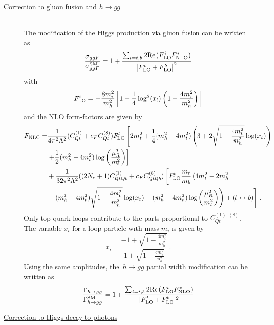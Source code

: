 	\begin{description}
		\item [\underline{Correction to gluon fusion and $h\to gg $ }] \hfill \vspace{0.3cm} \\
		The modification of the Higgs production via gluon fusion can be written as
		\begin{equation}
			\frac{\sigma_{ggF}}{\sigma_{ggF}^{\mathrm{SM}}}= 1+ \frac{ \sum_{i=t,b} 2 \mbox{Re}\,(F_{\textrm{LO}}^i F^*_{\textrm{NLO}})}{\left| F_{\textrm{LO}}^t+F_{\textrm{LO}}^b  \right|^2} \label{eq:production}
		\end{equation}
		with 
		\begin{equation}
			F_{\textrm{LO}}^i=-\frac{8m_i^2}{m_h^2}\left[1-\frac{1}{4}\log^2(x_i)\left(1-\frac{4m_i^2}{m_h^2}\right)\right]
		\end{equation}
		and the NLO form-factors are given by
		\begin{equation}
			\begin{split}
				F_{\textrm{NLO}}=&\frac{ 1}{4\pi^2  \Lambda^2}(C_{Qt}^{(1)}+c_FC_{Qt}^{(8)})F_{\textrm{LO}}^t \left[ 2 m_t^2  +\frac{1}{4} (m_h^2-4 m_t^2) \left( 3 +2 \sqrt{1-\frac{4 m_t^2}{m_h^2}} \log(x_t) \right)  \right. \\ & \left.
				+\frac{1}{2} (m_h^2-4 m_t^2) \log\left(\frac{\mu_R^2}{m_t^2}\right)\right] \\ & + 
				\frac{1}{32 \pi^2 \Lambda^2} ((2N_c+1)C_{QtQb}^{(1)}+c_FC_{QtQb}^{(8)}) \left[ F_{\textrm{LO}}^b \frac{m_t}{m_b}\left( 4 m_t^2-2 m_h^2 \right. \right.\\ & \left. \left. - (m_h^2-4 m_t^2)\sqrt{1-\frac{4 m_t^2}{m_h^2}} \log(x_t)-(m_h^2-4 m_t^2)\log\left(\frac{\mu_R^2}{m_t^2}\right)\right) +(t\leftrightarrow b)\right]  \,. \label{eq:FNLO}
			\end{split}
		\end{equation}
		Only top quark loops contribute to the parts proportional to $C_{Qt}^{(1),(8)}$. 
		The variable $x_i$ for a loop particle with mass $m_i$ is given by
		\begin{equation}
			x_i=\frac{-1+\sqrt{1-\frac{4 m_i^2}{m_h^2}}}{1+\sqrt{1-\frac{4 m_i^2}{m_h^2}}}\,. \label{eq:xvariable}
		\end{equation} 
		Using the same amplitudes, the~$ h \to gg$  partial width modification  can be written as
		\begin{equation}
			\frac{\Gamma_{h\to gg}}{\Gamma_{h\to gg}^{\mathrm{SM}}}= 1+ \frac{ \sum_{i=t,b} 2 \mbox{Re}\,(F_{\textrm{LO}}^i F^*_{\textrm{NLO}})}{ |F_{\textrm{LO}}^t+F_{\textrm{LO}}^b|^2} 
		\end{equation}
		\item [\underline{Correction to Higgs decay to photons }] \hfill  \vspace{0.3cm} \\

\end{description}
